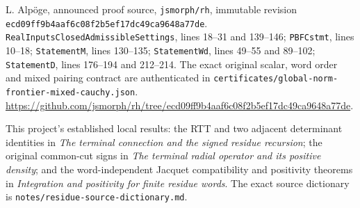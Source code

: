 L. Alp\"oge, announced proof source, \texttt{jsmorph/rh},
immutable revision
\texttt{ecd09ff9b4aaf6c08f2b5ef17dc49ca9648a77de}.
\texttt{RealInputsClosedAdmissibleSettings}, lines 18--31 and
139--146; \texttt{PBFCstmt}, lines 10--18;
\texttt{StatementM}, lines 130--135;
\texttt{StatementWd}, lines 49--55 and 89--102;
\texttt{StatementD}, lines 176--194 and 212--214.
The exact original scalar, word order and mixed pairing contract
are authenticated in
\texttt{certificates/global-norm-frontier-mixed-cauchy.json}.
\url{https://github.com/jsmorph/rh/tree/ecd09ff9b4aaf6c08f2b5ef17dc49ca9648a77de}.

This project's established local results:
the RTT and two adjacent determinant identities in
\emph{The terminal connection and the signed residue recursion};
the original common-cut signs in
\emph{The terminal radial operator and its positive density};
and the word-independent Jacquet compatibility and positivity
theorems in \emph{Integration and positivity for finite residue words}.
The exact source dictionary is
\texttt{notes/residue-source-dictionary.md}.
